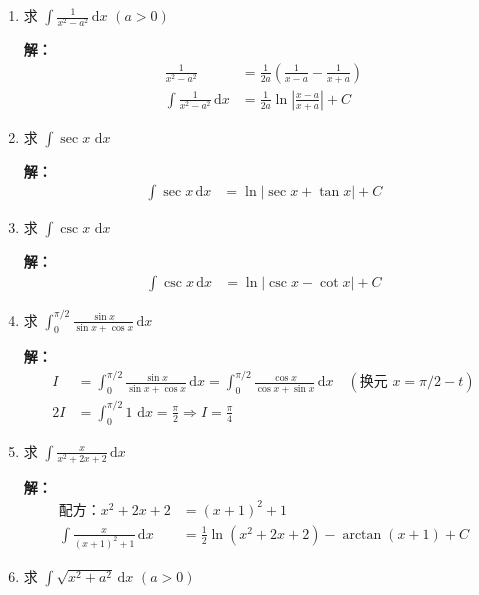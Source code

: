 \documentclass[12pt,a4paper]{article}
\newcommand{\dd}{\,\mathrm{d}}
\begin{document}
\begin{enumerate}[label=\textbf{\arabic*.}, leftmargin=*, itemsep=1.2em]
\textbf{解：}
\begin{align*}
\int \frac{1}{\sqrt{a^2 - x^2}} \dd x &= \arcsin\left( \frac{x}{a} \right) + C
\end{align*}

\item 求 $\displaystyle \int \frac{1}{x^2 - a^2} \dd x$ $(a>0)$

\textbf{解：}
\begin{align*}
\frac{1}{x^2 - a^2} &= \frac{1}{2a} \left( \frac{1}{x-a} - \frac{1}{x+a} \right) \\
\int \frac{1}{x^2 - a^2} \dd x &= \frac{1}{2a} \ln \left| \frac{x-a}{x+a} \right| + C
\end{align*}

\item 求 $\displaystyle \int \sec x \, \dd x$

\textbf{解：}
\begin{align*}
\int \sec x \dd x &= \ln |\sec x + \tan x| + C
\end{align*}

\item 求 $\displaystyle \int \csc x \, \dd x$

\textbf{解：}
\begin{align*}
\int \csc x \dd x &= \ln |\csc x - \cot x| + C
\end{align*}

\item 求 $\displaystyle \int_0^{\pi/2} \frac{\sin x}{\sin x + \cos x} \dd x$

\textbf{解：}
\begin{align*}
I &= \int_0^{\pi/2} \frac{\sin x}{\sin x + \cos x} \dd x = \int_0^{\pi/2} \frac{\cos x}{\cos x + \sin x} \dd x \quad (\text{换元 } x=\pi/2-t) \\
2I &= \int_0^{\pi/2} 1 \, \dd x = \frac{\pi}{2} \Rightarrow I = \frac{\pi}{4}
\end{align*}

\item 求 $\displaystyle \int \frac{x}{x^2 + 2x + 2} \dd x$

\textbf{解：}
\begin{align*}
\text{配方：} x^2+2x+2 &= (x+1)^2 + 1 \\
\int \frac{x}{(x+1)^2 + 1} \dd x &= \frac{1}{2} \ln(x^2+2x+2) - \arctan(x+1) + C
\end{align*}

\item 求 $\displaystyle \int \sqrt{x^2 + a^2} \dd x$ $(a>0)$


\end{enumerate}
\end{document}
